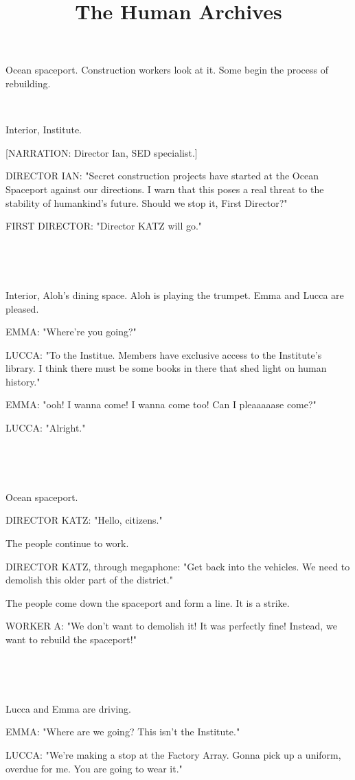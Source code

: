 \documentclass[11pt]{article}
\begin{document}
\ttfamily
\title{The Human Archives}
\maketitle

Ocean spaceport.
Construction workers look at it.
Some begin the process of rebuilding.

\ 

Interior, Institute.

[NARRATION: Director Ian, SED specialist.]

DIRECTOR IAN: "Secret construction projects have started at the Ocean Spaceport against our directions. 
I warn that this poses a real threat to the stability of humankind's future.
Should we stop it, First Director?"

FIRST DIRECTOR: "Director KATZ will go."

\ 

\ 

Interior, Aloh's dining space.
Aloh is playing the trumpet.
Emma and Lucca are pleased.

EMMA: "Where're you going?"

LUCCA: "To the Institue.
Members have exclusive access to the Institute's library.
I think there must be some books in there that shed light on human history."

EMMA: "ooh! I wanna come! I wanna come too! Can I pleaaaaase come?"

LUCCA: "Alright."

\ 

\ 

Ocean spaceport.

DIRECTOR KATZ: "Hello, citizens."

The people continue to work.

DIRECTOR KATZ, through megaphone: "Get back into the vehicles.
We need to demolish this older part of the district."

The people come down the spaceport and form a line.
It is a strike.

WORKER A: "We don't want to demolish it! It was perfectly fine!
Instead, we want to rebuild the spaceport!"

\ 

\ 

Lucca and Emma are driving.

EMMA: "Where are we going? This isn't the Institute."

LUCCA: "We're making a stop at the Factory Array.
Gonna pick up a uniform, overdue for me.
You are going to wear it."
\end{document}
